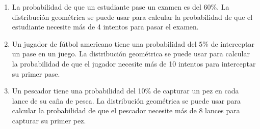 \begin{Ejer}
\begin{enumerate}
    \item La probabilidad de que un estudiante pase un examen es del 60\%. La distribución geométrica se puede usar para calcular la probabilidad de que el estudiante necesite más de 4 intentos para pasar el examen.
    \item Un jugador de fútbol americano tiene una probabilidad del 5\% de interceptar un pase en un juego. La distribución geométrica se puede usar para calcular la probabilidad de que el jugador necesite más de 10 intentos para interceptar su primer pase.
    \item Un pescador tiene una probabilidad del 10\% de capturar un pez en cada lance de su caña de pesca. La distribución geométrica se puede usar para calcular la probabilidad de que el pescador necesite más de 8 lances para capturar su primer pez.
\end{enumerate}
\end{Ejer} 

